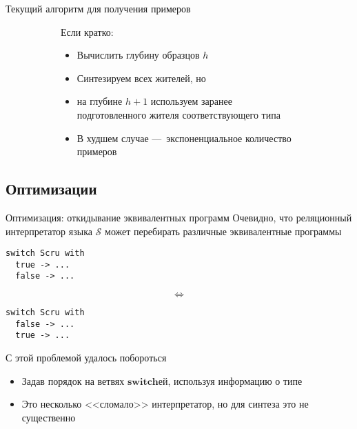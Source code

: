 \documentclass[aspectratio=169
  , xcolor={svgnames}
  , hyperref={ colorlinks,citecolor=Blue
             , linkcolor=DarkRed,urlcolor=DarkBlue}
  , russian
  ]{beamer}
\newcommand{\primi}[1]{\ensuremath{\mathbf{#1}}}
\newcommand{\ir}{\ensuremath{\mathcal{S}}}
\begin{document}
\begin{frame}{Текущий алгоритм для получения примеров}
\begin{figure}
\begin{subfigure}[b]{0.75\linewidth}
Если кратко:
\begin{itemize}
\item Вычислить глубину образцов $h$
\item Синтезируем всех жителей, но
\item на глубине $h+1$ используем заранее подготовленного жителя соответствующего типа
\end{itemize}
\vspace{1cm}

\begin{itemize}
\item[\faBad] В худшем случае ---~экспоненциальное количество примеров
\end{itemize}
\end{subfigure}
\end{figure}
\end{frame}

\subsection{Оптимизации}

\begin{frame}[fragile]{Оптимизация: откидывание эквивалентных программ}
Очевидно, что реляционный интерпретатор языка \ir{} может перебирать различные эквивалентные программы
\begin{center}
  \begin{minipage}[t]{0.2\linewidth}
  \begin{center}
  \begin{lstlisting}[language=ocamllambda,gobble=2]
  switch Scru with 
  true -> ...
  false -> ...
  \end{lstlisting}
  \end{center}
  \end{minipage}\hspace{.5cm}
  \begin{minipage}[t]{0.2\linewidth}
  \huge
  \begin{center}
  \[
  \Leftrightarrow
  \]
  \end{center}
  \end{minipage}\hspace{.5cm}
  \begin{minipage}[t]{0.2\linewidth}
  \begin{lstlisting}[language=ocamllambda,gobble=2]
  switch Scru with 
  false -> ...
  true -> ...
  \end{lstlisting}
  \end{minipage}
\end{center}
С этой проблемой удалось побороться
\begin{itemize}
\item Задав порядок на ветвях \primi{switch}ей, используя информацию о типе
\item Это несколько <<сломало>> интерпретатор, но для синтеза это не существенно
\end{itemize}

\end{frame}
\end{document}
